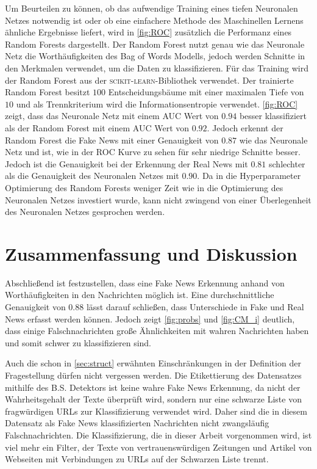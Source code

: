 Um Beurteilen zu können, ob das aufwendige Training eines tiefen Neuronalen Netzes notwendig ist oder ob eine einfachere
Methode des Maschinellen Lernens ähnliche Ergebnisse liefert, wird in \autoref{fig:ROC} zusätzlich die Performanz eines 
Random Forests dargestellt.
Der Random Forest nutzt genau wie das Neuronale Netz die Worthäufigkeiten des Bag of Words Modells, jedoch 
werden Schnitte in den Merkmalen verwendet, um die Daten zu klassifizieren.
Für das Training wird der Random Forest aus der \textsc{scikit-learn}-Bibliothek\cite{scikit-learn} verwendet.
Der trainierte Random Forest besitzt $100$ Entscheidungsbäume mit einer maximalen Tiefe von $10$ und als Trennkriterium wird die 
Informationsentropie verwendet.
\autoref{fig:ROC} zeigt, dass das Neuronale Netz mit einem AUC Wert von $0.94$ besser klassifiziert als der Random Forest
mit einem AUC Wert von $0.92$.
Jedoch erkennt der Random Forest die Fake News mit einer Genauigkeit von $0.87$ wie das Neuronale Netz und ist, wie 
in der ROC Kurve zu sehen für sehr niedrige Schnitte besser.
Jedoch ist die Genauigkeit bei der Erkennung der Real News mit $0.81$ schlechter als die Genauigkeit des Neuronalen 
Netzes mit $0.90$. 
Da in die Hyperparameter Optimierung des Random Forests weniger Zeit wie in die Optimierung des Neuronalen 
Netzes investiert wurde, kann nicht zwingend von einer Überlegenheit des Neuronalen Netzes gesprochen werden.


\chapter{Zusammenfassung und Diskussion}
Abschließend ist festzustellen, dass eine Fake News Erkennung anhand von Worthäufigkeiten in den Nachrichten möglich 
ist.
Eine durchschnittliche Genauigkeit von $0.88$ lässt darauf schließen, dass Unterschiede in Fake und Real News erfasst
werden können.
Jedoch zeigt \autoref{fig:probs} und \autoref{fig:CM_i} deutlich, dass einige Falschnachrichten große 
Ähnlichkeiten mit wahren Nachrichten haben und somit schwer zu klassifizieren sind.

Auch die schon in \autoref{sec:struct} erwähnten Einschränkungen in der Definition der Fragestellung dürfen nicht 
vergessen werden.
Die Etikettierung des Datensatzes mithilfe des B.S. Detektors ist keine wahre Fake News Erkennung, da nicht der 
Wahrheitsgehalt der Texte überprüft wird, sondern nur eine schwarze Liste von fragwürdigen URLs zur Klassifizierung 
verwendet wird.
Daher sind die in diesem Datensatz als Fake News klassifizierten Nachrichten nicht zwangsläufig Falschnachrichten. 
Die Klassifizierung, die in dieser Arbeit vorgenommen wird, ist viel mehr ein Filter, der Texte von 
vertrauenswürdigen Zeitungen und Artikel von Webseiten mit Verbindungen zu URLs auf der Schwarzen Liste trennt.

